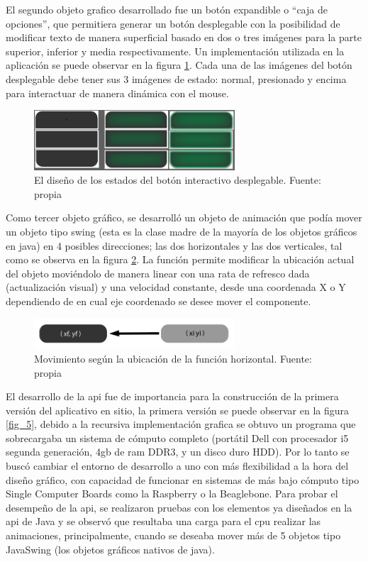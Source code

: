 El segundo objeto grafico desarrollado fue un botón expandible o ``caja de opciones'', que permitiera generar un botón desplegable con la posibilidad de modificar texto de manera superficial basado en dos o tres imágenes para la parte superior, inferior y media respectivamente. Un implementación utilizada en la aplicación se puede observar en la figura \ref{fig_3}. Cada una de las imágenes del botón desplegable debe tener sus 3 imágenes de estado: normal, presionado y encima para interactuar de manera dinámica con el mouse.

\begin{figure}[htbp]
	\centerline{\includegraphics[width=7.5cm]{./figuras/boton_desplegable.png}}
	\caption{El diseño de los estados del botón interactivo desplegable. Fuente: propia}
	\label{fig_3}
\end{figure}

Como tercer objeto gráfico, se desarrolló un objeto de animación que podía mover un objeto tipo swing (esta es la clase madre de la mayoría de los objetos gráficos en java) en 4 posibles direcciones; las dos horizontales y las dos verticales, tal como se observa en la figura \ref{fig_4}. La función permite modificar la ubicación actual del objeto moviéndolo de manera linear con una rata de refresco dada (actualización visual) y una velocidad constante, desde una coordenada X o Y dependiendo de en cual eje coordenado se desee mover el componente.

\begin{figure}[htbp]
	\centerline{\includegraphics[width=7.5cm]{./figuras/boton_movimiento.png}}
	\caption{Movimiento según la ubicación de la función horizontal. Fuente: propia}
	\label{fig_4}
\end{figure}

El desarrollo de la api fue de importancia para la construcción de la primera versión del aplicativo en sitio, la primera versión se puede observar en la figura \ref{fig_5}, debido a la recursiva implementación grafica se obtuvo un programa que sobrecargaba un sistema de cómputo completo (portátil Dell con procesador i5 segunda generación, 4gb de ram DDR3, y un disco duro HDD). Por lo tanto se buscó cambiar el entorno de desarrollo a uno con más flexibilidad a la hora del diseño gráfico, con capacidad de funcionar en sistemas de más bajo cómputo tipo Single Computer Boards como la Raspberry o la Beaglebone. Para probar el desempeño de la api, se realizaron pruebas con los elementos ya diseñados en la api de Java y se observó que resultaba una carga para el cpu realizar las animaciones, principalmente, cuando se deseaba mover más de 5 objetos tipo JavaSwing (los objetos gráficos nativos de java).

